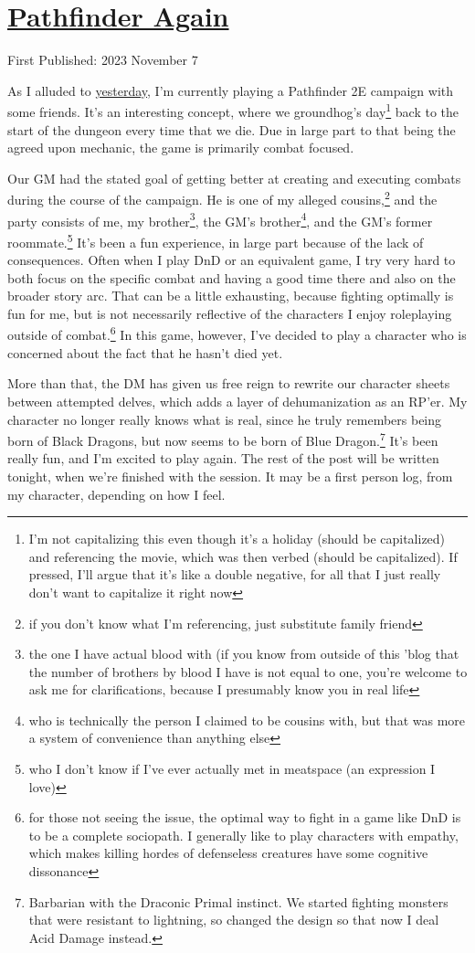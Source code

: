 \documentclass[12pt]{article}[titlepage]
\renewcommand{\,}{\textsuperscript{,}}
\begin{document}
\doublespacing
\section{\href{pathfinder-2.html}{Pathfinder Again}}
First Published: 2023 November 7

As I alluded to \href{dungeons-dragons-5.html}{yesterday}, I'm currently playing a Pathfinder 2E campaign with some friends.
It's an interesting concept, where we groundhog's day\footnote{I'm not capitalizing this even though it's a holiday (should be capitalized) and referencing the movie, which was then verbed (should be capitalized). If pressed, I'll argue that it's like a double negative, for all that I just really don't want to capitalize it right now}
back to the start of the dungeon every time that we die.
Due in large part to that being the agreed upon mechanic, the game is primarily combat focused.

Our GM had the stated goal of getting better at creating and executing combats during the course of the campaign.
He is one of my alleged cousins,\footnote{if you don't know what I'm referencing, just substitute family friend} and the party consists of me, my brother\footnote{the one I have actual blood with (if you know from outside of this 'blog that the number of brothers by blood I have is not equal to one, you're welcome to ask me for clarifications, because I presumably know you in real life}, the GM's brother\footnote{who is technically the person I claimed to be cousins with, but that was more a system of convenience than anything else}, and the GM's former roommate.\footnote{who I don't know if I've ever actually met in meatspace (an expression I love)}
It's been a fun experience, in large part because of the lack of consequences.
Often when I play DnD or an equivalent game, I try very hard to both focus on the specific combat and having a good time there and also on the broader story arc.
That can be a little exhausting, because fighting optimally is fun for me, but is not necessarily reflective of the characters I enjoy roleplaying outside of combat.\footnote{for those not seeing the issue, the optimal way to fight in a game like DnD is to be a complete sociopath.
I generally like to play characters with empathy, which makes killing hordes of defenseless creatures have some cognitive dissonance}
In this game, however, I've decided to play a character who is concerned about the fact that he hasn't died yet.

More than that, the DM has given us free reign to rewrite our character sheets between attempted delves, which adds a layer of dehumanization as an RP'er.
My character no longer really knows what is real, since he truly remembers being born of Black Dragons, but now seems to be born of Blue Dragon.\footnote{Barbarian with the Draconic Primal instinct.
We started fighting monsters that were resistant to lightning, so changed the design so that now I deal Acid Damage instead.}
It's been really fun, and I'm excited to play again.
The rest of the post will be written tonight, when we're finished with the session.
It may be a first person log, from my character, depending on how I feel.
\end{document}
